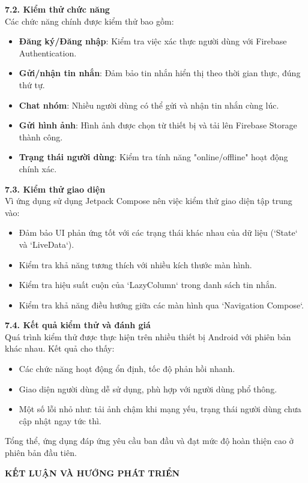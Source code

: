 \documentclass[12pt,a4paper]{article}
\begin{document}
	\textbf{7.2. Kiểm thử chức năng} \\
	Các chức năng chính được kiểm thử bao gồm:
	\begin{itemize}
		\item \textbf{Đăng ký/Đăng nhập}: Kiểm tra việc xác thực người dùng với Firebase Authentication.
		\item \textbf{Gửi/nhận tin nhắn}: Đảm bảo tin nhắn hiển thị theo thời gian thực, đúng thứ tự.
		\item \textbf{Chat nhóm}: Nhiều người dùng có thể gửi và nhận tin nhắn cùng lúc.
		\item \textbf{Gửi hình ảnh}: Hình ảnh được chọn từ thiết bị và tải lên Firebase Storage thành công.
		\item \textbf{Trạng thái người dùng}: Kiểm tra tính năng "online/offline" hoạt động chính xác.
	\end{itemize}
	
	\textbf{7.3. Kiểm thử giao diện} \\
	Vì ứng dụng sử dụng Jetpack Compose nên việc kiểm thử giao diện tập trung vào:
	\begin{itemize}
		\item Đảm bảo UI phản ứng tốt với các trạng thái khác nhau của dữ liệu (`State` và `LiveData`).
		\item Kiểm tra khả năng tương thích với nhiều kích thước màn hình.
		\item Kiểm tra hiệu suất cuộn của `LazyColumn` trong danh sách tin nhắn.
		\item Kiểm tra khả năng điều hướng giữa các màn hình qua `Navigation Compose`.
	\end{itemize}
	
	\textbf{7.4. Kết quả kiểm thử và đánh giá} \\
	Quá trình kiểm thử được thực hiện trên nhiều thiết bị Android với phiên bản khác nhau. Kết quả cho thấy:
	\begin{itemize}
		\item Các chức năng hoạt động ổn định, tốc độ phản hồi nhanh.
		\item Giao diện người dùng dễ sử dụng, phù hợp với người dùng phổ thông.
		\item Một số lỗi nhỏ như: tải ảnh chậm khi mạng yếu, trạng thái người dùng chưa cập nhật ngay tức thì.
	\end{itemize}
	Tổng thể, ứng dụng đáp ứng yêu cầu ban đầu và đạt mức độ hoàn thiện cao ở phiên bản đầu tiên.
	
	\vspace{0.5cm}
	\textbf{KẾT LUẬN VÀ HƯỚNG PHÁT TRIỂN} \\
	
\end{document}
